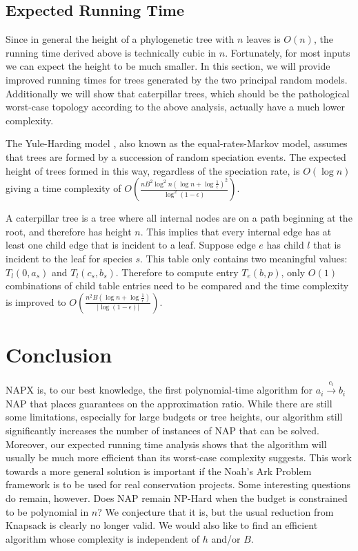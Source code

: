 \documentclass[10pt]{llncs}       \usepackage{graphicx,subfigure}
\begin{document}
\subsection{Expected Running Time}

Since in general
 the height of a phylogenetic tree with $n$ leaves is $O(n)$, the running
time derived above is technically cubic in $n$.  Fortunately, for most 
inputs we can expect the height to be much smaller.  In this section, we
will provide improved running times for trees generated by the two principal
random models.  Additionally we will show that caterpillar trees, which
should be the pathological worst-case topology according to the 
above analysis, actually have a much lower complexity.

The Yule-Harding model \cite{yule25}\cite{harding71}, also known as the 
equal-rates-Markov model, assumes that trees are formed by a succession
of random speciation events.  The expected height of trees formed in this
way, regardless of the speciation rate, is $O(\log{n})$ \cite{erdos99} giving
a time complexity of $O\left(\frac{nB^2\log^2n\left(\log{n} + \log{\frac{1}{\epsilon}}\right)^2}
{\log^2(1-\epsilon)}\right)$.

A caterpillar tree is a tree where all internal nodes are on a path beginning
at the root, and therefore has height $n$. This implies 
that every internal edge has at least one child edge that is incident to a 
leaf.  Suppose edge $e$ has child $l$ that is incident to the leaf for 
species $s$.  This 
table only contains two meaningful values: $T_l(0, a_s)$ and $T_l(c_s, b_s)$.
Therefore to compute entry $T_e(b,p)$, only $O(1)$ combinations of child table
entries need to be compared and the time complexity is improved to
$O\left(\frac{n^2B\left(\log{n} + \log{\frac{1}{\epsilon}}\right)}
{|\log(1-\epsilon)|}\right)$.


\section{Conclusion}

NAPX is, to our best knowledge, the first polynomial-time algorithm for 
$a_i\xrightarrow{c_i}b_i$ NAP that places guarantees on the approximation
ratio. While there are still some limitations, especially for
 large budgets or tree heights, our algorithm still significantly 
increases the
number of instances of NAP that can be solved.  Moreover, our expected
running time analysis shows that the algorithm will usually be much more
efficient than its worst-case complexity suggests.  This
work towards a more general solution is important if the Noah's Ark Problem
 framework
is to be used for real conservation projects.  Some interesting questions do
remain, however.  Does NAP remain NP-Hard when the budget is constrained to
be polynomial in $n$?  We conjecture that it is, but the usual reduction from
Knapsack is clearly no longer valid. We would also like to find
an efficient algorithm whose complexity is independent of $h$ and/or $B$.    

 

\end{document}
